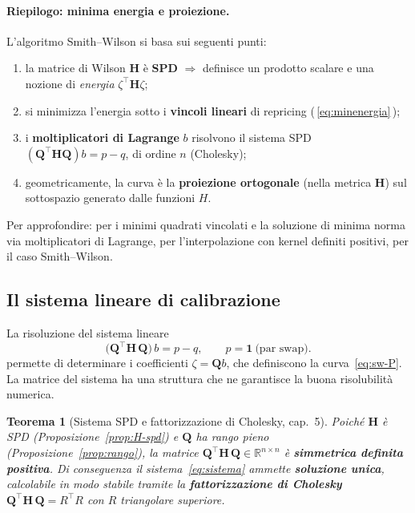 \documentclass[11pt,a4paper]{article}
\theoremstyle{plain}
\newtheorem{teorema}{Teorema}[section]
\theoremstyle{definition}
\theoremstyle{remark}
\newcommand{\Qmat}{\mathbf{Q}}
\newcommand{\Hmat}{\mathbf{H}}
\newcommand{\transp}{^{\!\top}}
\begin{document}
\paragraph{Riepilogo: minima energia e proiezione.}
L'algoritmo Smith--Wilson si basa sui seguenti punti:
\begin{enumerate}
  \item la matrice di Wilson $\Hmat$ \`e \textbf{SPD} $\Rightarrow$ definisce un prodotto
        scalare e una nozione di \emph{energia} $\zeta\transp\Hmat\zeta$;
  \item si minimizza l'energia sotto i \textbf{vincoli lineari} di repricing
        (\,\eqref{eq:minenergia}\,);
  \item i \textbf{moltiplicatori di Lagrange} $b$ risolvono il sistema SPD
        $(\Qmat\transp\Hmat\Qmat)b = p-q$, di ordine $n$ (Cholesky);
  \item geometricamente, la curva \`e la \textbf{proiezione ortogonale} (nella metrica
        $\Hmat$) sul sottospazio generato dalle funzioni $H$.
\end{enumerate}
Per approfondire: \cite{boyd2018} per i minimi quadrati vincolati e la soluzione di minima
norma via moltiplicatori di Lagrange, \cite{fasshauer2007} per l'interpolazione con kernel
definiti positivi, \cite{lageras2016} per il caso Smith--Wilson.

\subsection{Il sistema lineare di calibrazione}

La risoluzione del sistema lineare
\begin{equation}
  \bigl(\Qmat\transp \Hmat\, \Qmat\bigr)\, b = p - q,
  \qquad p = \mathbf{1}\ \text{(par swap)} .
  \label{eq:sistema}
\end{equation}
permette di determinare i coefficienti $\zeta = \Qmat b$, che definiscono la curva~\eqref{eq:sw-P}.
La matrice del sistema ha una struttura che ne garantisce la buona risolubilit\`a numerica.

\begin{teorema}[Sistema SPD e fattorizzazione di Cholesky, \cite{quarteroni2017} cap.~5]
\label{thm:spd}
Poich\'e $\Hmat$ \`e SPD (Proposizione~\ref{prop:H-spd}) e $\Qmat$ ha rango pieno
(Proposizione~\ref{prop:rango}), la matrice
$\Qmat\transp \Hmat\, \Qmat \in \mathbb{R}^{n\times n}$ \`e \textbf{simmetrica
definita positiva}. Di conseguenza il sistema~\eqref{eq:sistema} ammette \textbf{soluzione
unica}, calcolabile in modo stabile tramite la \textbf{fattorizzazione di Cholesky}
$\Qmat\transp \Hmat\,\Qmat = R\transp R$ con $R$ triangolare superiore.
\end{teorema}
\end{document}

